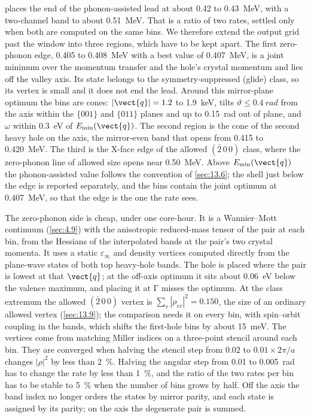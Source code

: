  places the end of the phonon-assisted lead at about 0.42 to \SI{0.43}{MeV}, with a two-channel band to about \SI{0.51}{MeV}. That is a ratio of two rates, settled only when both are computed on the same bins. We therefore extend the output grid past the window into three regions, which have to be kept apart. The first zero-phonon edge, 0.405 to \SI{0.408}{MeV} with a best value of \SI{0.407}{MeV}, is a joint minimum over the momentum transfer and the hole's crystal momentum and lies off the valley axis. Its state belongs to the symmetry-suppressed (glide) class, so its vertex is small and it does not end the lead. Around this mirror-plane optimum the bins are cones: $|\vect{q}| = 1.2$ to \SI{1.9}{keV}, tilts $\vartheta \le \SI{0.4}{rad}$ from the axis within the $\{001\}$ and $\{011\}$ planes and up to \SI{0.15}{rad} out of plane, and $\omega$ within \SI{0.3}{eV} of $E_{\mathrm{min}}(\vect{q})$. The second region is the cone of the second heavy hole on the axis, the mirror-even band that opens from 0.415 to \SI{0.420}{MeV}. The third is the X-face edge of the allowed $(\bar2\,0\,0)$ class, where the zero-phonon line of allowed size opens near \SI{0.50}{MeV}. Above $E_{\mathrm{min}}(\vect{q})$ the phonon-assisted value follows the convention of \cref{sec:13.6}; the shell just below the edge is reported separately, and the bins contain the joint optimum at \SI{0.407}{MeV}, so that the edge is the one the rate sees.

The zero-phonon side is cheap, under one core-hour. It is a Wannier--Mott continuum (\cref{sec:4.9}) with the anisotropic reduced-mass tensor of the pair at each bin, from the Hessians of the interpolated bands at the pair's two crystal momenta. It uses a static $\varepsilon_\infty$ and density vertices computed directly from the plane-wave states of both top heavy-hole bands. The hole is placed where the pair is lowest at that $\vect{q}$; at the off-axis optimum it sits about \SI{0.06}{eV} below the valence maximum, and placing it at $\mathrm{\Gamma}$ misses the optimum. At the class extremum the allowed $(\bar2\,0\,0)$ vertex is $\sum_v|\rho_{cv}|^2 = 0.150$, the size of an ordinary allowed vertex (\cref{sec:13.9}); the comparison needs it on every bin, with spin--orbit coupling in the bands, which shifts the first-hole bins by about \SI{15}{meV}. The vertices come from matching Miller indices on a three-point stencil around each bin. They are converged when halving the stencil step from $0.02$ to $0.01\times2\pi/a$ changes $|\rho|^2$ by less than \SI{2}{\percent}. Halving the angular step from 0.01 to \SI{0.005}{rad} has to change the rate by less than \SI{1}{\percent}, and the ratio of the two rates per bin has to be stable to \SI{5}{\percent} when the number of bins grows by half. Off the axis the band index no longer orders the states by mirror parity, and each state is assigned by its parity; on the axis the degenerate pair is summed.

